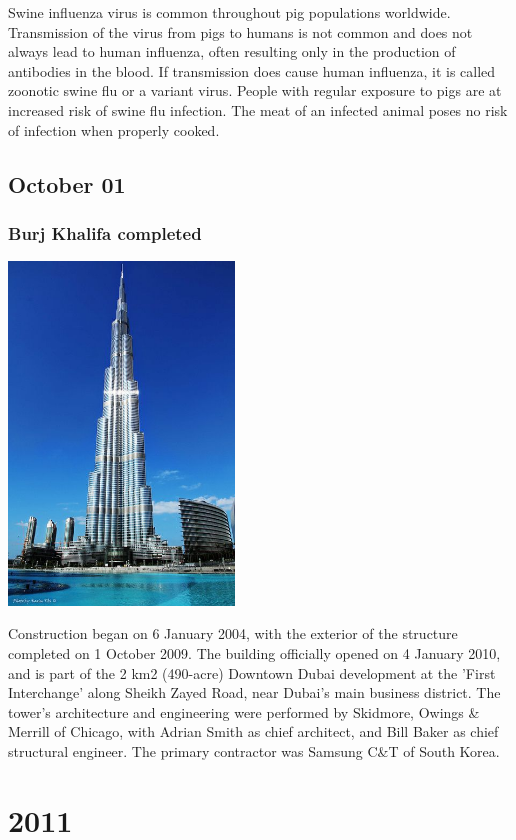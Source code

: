 \documentclass[11pt]{report}
\begin{document}
Swine influenza virus is common throughout pig populations worldwide. Transmission of the virus from pigs to humans is not common and does not always lead to human influenza, often resulting only in the production of antibodies in the blood. If transmission does cause human influenza, it is called zoonotic swine flu or a variant virus. People with regular exposure to pigs are at increased risk of swine flu infection. The meat of an infected animal poses no risk of infection when properly cooked.

\section{October 01}
\subsection{Burj Khalifa completed}
\vspace{2mm}\begin{center}\includegraphics[width=6cm]{./img/burjKhalifa.jpg}\end{center}
Construction began on 6 January 2004, with the exterior of the structure completed on 1 October 2009. The building officially opened on 4 January 2010, and is part of the 2 km2 (490-acre) Downtown Dubai development at the 'First Interchange' along Sheikh Zayed Road, near Dubai's main business district. The tower's architecture and engineering were performed by Skidmore, Owings \& Merrill of Chicago, with Adrian Smith as chief architect, and Bill Baker as chief structural engineer. The primary contractor was Samsung C\&T of South Korea.

\chapter{2011}
\end{document}
